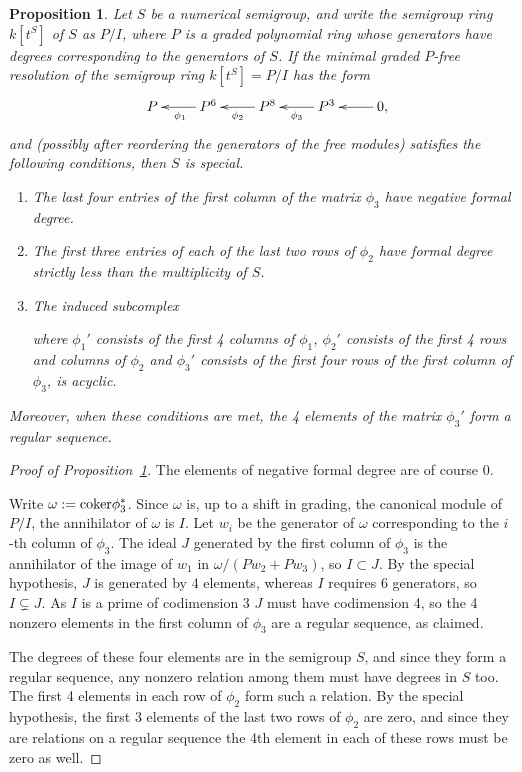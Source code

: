 \documentclass[twoside,12pt, leqno]{amsart}
\def\coker{{\rm coker}}
\newtheorem{proposition}[theorem]{Proposition}
\theoremstyle{definition}
\begin{document}
\begin{proposition}\label{stability of conditions}
Let $S$ be a numerical semigroup, and write the semigroup ring $k[t^{S}]$ of $S$ as $P/I$, where $P$ is a graded polynomial ring 
whose generators have degrees corresponding to the generators of $S$.
If the minimal graded $P$-free resolution of the semigroup ring $k[t^{S}] = P/I$
  has the form
  $$
 \quad 
 \xymatrix{P&\ar[l]^{\phi_{1}} P^{6}&\ar[l]^{\phi_{2}}  P^{8}&\ar[l]^{\phi_{3}} P^{3} &\ar[l] 0, }
 $$
and (possibly after reordering the generators of the free modules)
satisfies the following conditions, then $S$ is special.
\begin{enumerate}
 \item The last four entries of the first column of the matrix $\phi_{3}$ 
 have negative formal degree.
 \item The first three entries of each of the last two rows of $\phi_{2}$
 have formal degree strictly less than the multiplicity of
 $S$.
 \item The induced subcomplex \\
  \centerline{
 \quad {}
 }
 where $\phi_{1}'$ consists of the first 4 columns of $\phi_{1}$,
 $\phi_{2}'$ consists of the first 4 rows and columns of $\phi_{2}$
  and $\phi_{3}'$
 consists of the first four rows of the first column of $\phi_{3}$,
 is acyclic.
\end{enumerate}
Moreover, when these conditions are met, the 4 elements of the matrix $\phi_{3}'$
form a regular sequence.
\end{proposition}

\begin{proof} [Proof of Proposition~\ref{stability of conditions}]
 The elements of negative formal degree are of course 0. 
 
 Write $\omega := \coker \phi_{3}^{*}$. Since $\omega$ is, up to a shift in
grading, the canonical module of 
$P/I$, the annihilator of $\omega$ is $I$. Let $w_{i}$ be the generator of $\omega$
corresponding to the $i$-th column of $\phi_{3}$.
The ideal $J$ generated by the first column of $\phi_{3}$ is the annihilator
of the image of $w_{1}$ in $\omega/(Pw_{2}+Pw_{3})$, so $I\subset J$. By
the special hypothesis, $J$ is generated by 4 elements, whereas 
$I$ requires 6 generators, so $I\subsetneq J$. As $I$ is a prime of codimension 3
$J$ must have codimension 4, so the 4 nonzero elements in the first column of $\phi_{3}$
are a regular sequence, as claimed.

The degrees of these four elements are in the semigroup $S$, and since
they form a regular sequence, any nonzero relation
among them must have degrees in $S$ too.  
The first 4 elements in each row of
$\phi_{2}$ form such a relation.
By the special
hypothesis, the first 3 elements of the last two rows of $\phi_{2}$ are zero,
and since they are relations on a regular sequence the 4th element in each of these rows must be zero as well.
\end{proof}
\end{document}
